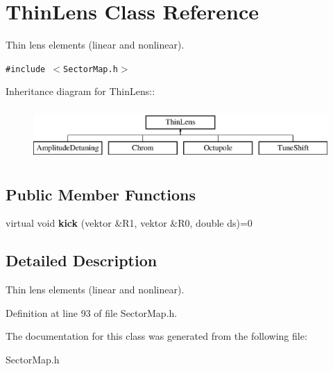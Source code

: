 \section{Thin\-Lens Class Reference}
\label{classThinLens}
Thin lens elements (linear and nonlinear). 


{\tt \#include $<$Sector\-Map.h$>$}

Inheritance diagram for Thin\-Lens::\begin{figure}[H]
\begin{center}
\leavevmode
\includegraphics[height=2cm]{classThinLens}
\end{center}
\end{figure}
\subsection*{Public Member Functions}
\begin{CompactItemize}
\item 
virtual void {\bf kick} (vektor \&R1, vektor \&R0, double ds)=0\label{classThinLens_a0}

\end{CompactItemize}


\subsection{Detailed Description}
Thin lens elements (linear and nonlinear).



Definition at line 93 of file Sector\-Map.h.

The documentation for this class was generated from the following file:\begin{CompactItemize}
\item 
Sector\-Map.h\end{CompactItemize}

